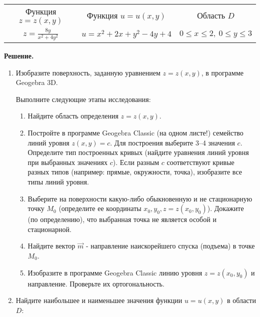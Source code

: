\begin{enumerate}[label=\Alph*.]
    \vspace{5mm}

    \begin{tabular}{ccc}
        Функция $z = z(x, y)$                     & Функция $u = u(x, y)$         & Область $D$                          \\
        $\displaystyle z = \frac{8y}{x^2 + 4y^2}$ & $u = x^2 + 2x + y^2 - 4y + 4$ & $0 \leq x \leq 2, \ 0 \leq y \leq 3$
    \end{tabular}
\end{enumerate}

\vspace{10mm}
\textbf{Решение.}

\begin{enumerate}[label=\Alph*.]
    \item Изобразите поверхность, заданную уравнением $z=z(x,y)$, в программе Geogebra 3D.

    Выполните следующие этапы исследования:

    \begin{enumerate}[label=\arabic*.]
        \item Найдите область определения $z = z(x, y)$.

        \item Постройте в программе Geogebra Classic (на одном листе!) семейство линий уровня $z(x, y) = c$.
        Для построения выберите 3–4 значения $c$.
        Определите тип построенных кривых (найдите уравнения линий уровня при выбранных значениях $c$).
        Если разным $c$ соответствуют кривые разных типов (например: прямые, окружности, точка), изобразите все типы линий уровня.

        \item Выберите на поверхности какую-либо обыкновенную и не стационарную точку $M_0$ (определите ее координаты $x_0, y_0, z = z(x_0, y_0)$).
        Докажите (по определению), что выбранная точка не является особой и стационарной.

        \item Найдите вектор $\overrightarrow{m}$ - направление наискорейшего спуска (подъема) в точке $M_0$.

        \item Изобразите в программе Geogebra Classic линию уровня $z = z(x_0, y_0)$ и направление.
        Проверьте их ортогональность.

    \end{enumerate}

    \item Найдите наибольшее и наименьшее значения функции $u = u(x, y)$ в области $D$:


\end{enumerate}
